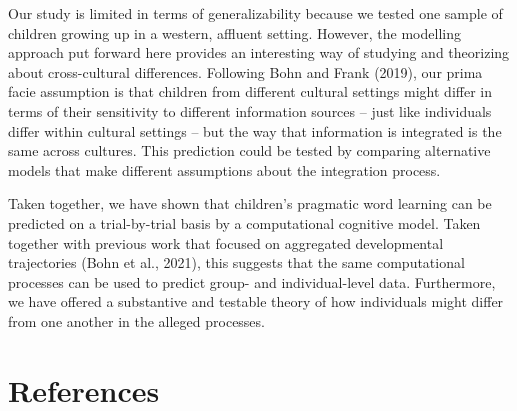 \documentclass[
  man,floatsintext]{apa6}
\begin{document}
Our study is limited in terms of generalizability because we tested one sample of children growing up in a western, affluent setting. However, the modelling approach put forward here provides an interesting way of studying and theorizing about cross-cultural differences. Following Bohn and Frank (2019), our prima facie assumption is that children from different cultural settings might differ in terms of their sensitivity to different information sources -- just like individuals differ within cultural settings -- but the way that information is integrated is the same across cultures. This prediction could be tested by comparing alternative models that make different assumptions about the integration process.

Taken together, we have shown that children's pragmatic word learning can be predicted on a trial-by-trial basis by a computational cognitive model. Taken together with previous work that focused on aggregated developmental trajectories (Bohn et al., 2021), this suggests that the same computational processes can be used to predict group- and individual-level data. Furthermore, we have offered a substantive and testable theory of how individuals might differ from one another in the alleged processes.

\newpage

\hypertarget{references}{%
\section{References}\label{references}}

\begingroup
\setlength{\parindent}{-0.5in}
\setlength{\leftskip}{0.5in}
\end{document}
